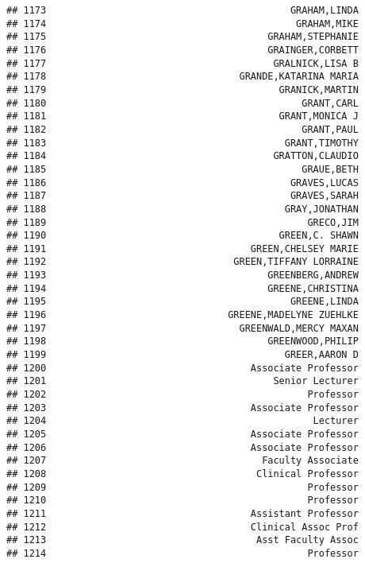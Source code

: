 \documentclass[
]{article}
\begin{document}
\begin{verbatim}
## 1173                                           GRAHAM,LINDA
## 1174                                            GRAHAM,MIKE
## 1175                                       GRAHAM,STEPHANIE
## 1176                                       GRAINGER,CORBETT
## 1177                                        GRALNICK,LISA B
## 1178                                  GRANDE,KATARINA MARIA
## 1179                                         GRANICK,MARTIN
## 1180                                             GRANT,CARL
## 1181                                         GRANT,MONICA J
## 1182                                             GRANT,PAUL
## 1183                                          GRANT,TIMOTHY
## 1184                                        GRATTON,CLAUDIO
## 1185                                             GRAUE,BETH
## 1186                                           GRAVES,LUCAS
## 1187                                           GRAVES,SARAH
## 1188                                          GRAY,JONATHAN
## 1189                                              GRECO,JIM
## 1190                                         GREEN,C. SHAWN
## 1191                                    GREEN,CHELSEY MARIE
## 1192                                 GREEN,TIFFANY LORRAINE
## 1193                                       GREENBERG,ANDREW
## 1194                                       GREENE,CHRISTINA
## 1195                                           GREENE,LINDA
## 1196                                GREENE,MADELYNE ZUEHLKE
## 1197                                  GREENWALD,MERCY MAXAN
## 1198                                       GREENWOOD,PHILIP
## 1199                                          GREER,AARON D
## 1200                                    Associate Professor
## 1201                                        Senior Lecturer
## 1202                                              Professor
## 1203                                    Associate Professor
## 1204                                               Lecturer
## 1205                                    Associate Professor
## 1206                                    Associate Professor
## 1207                                      Faculty Associate
## 1208                                     Clinical Professor
## 1209                                              Professor
## 1210                                              Professor
## 1211                                    Assistant Professor
## 1212                                    Clinical Assoc Prof
## 1213                                     Asst Faculty Assoc
## 1214                                              Professor

\end{verbatim}
\end{document}

